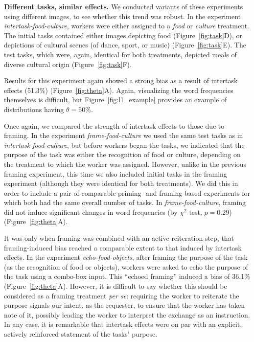 \documentclass{sigchi}
\begin{document}
{\bf Different tasks, similar effects.} We conducted variants of these experiments using different images, to see 
whether this trend was robust.  In the experiment 
\textit{intertask-food-culture},
workers were either assigned to a \textit{food} or \textit{culture} treatment.
The initial tasks contained either images 
depicting food (Figure~\ref{fig:task}D), or depictions of cultural scenes 
(of dance, sport, or music) (Figure~\ref{fig:task}E).  The test tasks, 
which 
were, again, identical for both treatments, depicted meals of diverse 
cultural origin
(Figure~\ref{fig:task}F).  

Results for this experiment again showed a 
strong bias as a result of intertask effects (51.3\%) 
(Figure~\ref{fig:theta}A).  Again, visualizing the word frequencies 
themselves is difficult, but Figure~\ref{fig:l1_example} provides an 
example of distributions having $\theta = 50\%$.

Once again, we compared the strength of intertask effects to those due to 
framing. In the experiment \textit{frame-food-culture} we used
the same test tasks as in \textit{intertask-food-culture}, but before
workers began the tasks, we indicated
that the purpose of the task was either the recognition of food or 
culture, depending on the treatment to which the worker was assigned.  
However, unlike in the previous framing experiment, this time we also 
included initial tasks in the framing experiment (although they were 
identical for both treatments).  We did this in order to include a pair of
comparable priming- and framing-based experiments
for which both had the same overall number of tasks.
In \textit{frame-food-culture}, framing did not induce 
significant changes in word frequencies 
(by $\chi^2$ test, $p=0.29$) (Figure~\ref{fig:theta}A).

It was only when framing was combined with an active reiteration step, 
that framing-induced bias reached a comparable extent to that induced by 
intertask effects.  In the experiment \textit{echo-food-objects},
after framing the purpose of the task (as the recognition of food
or objects), workers were asked to echo the purpose of the task
using a combo-box input.  This  ``echoed framing'' induced a bias of 
36.1\% (Figure~\ref{fig:theta}A). However, it is difficult to say whether this 
should be considered as a framing treatment \textit{per se}:
requiring the worker to reiterate the purpose signals our intent, as the 
requester, to ensure that the worker has taken note of it, possibly leading 
the worker to interpret the exchange as an instruction.  
In any case, it is remarkable that intertask effects
were on par with an explicit, actively reinforced statement of the tasks' 
purpose.
\end{document}

